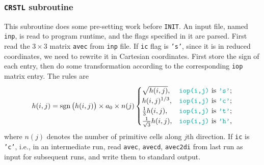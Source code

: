 
\subsubsection{\texttt{CRSTL} subroutine}
\label{sssec:crstl}

This subroutine does some pre-setting work before \texttt{INIT}.
An input file, named \texttt{inp}, is read to program runtime, and the flags
specified in it are parsed.
First read the $3 \times 3$ matrix \texttt{avec} from \texttt{inp} file.
If \texttt{ic} flag is \texttt{'s'},
since it is in reduced coordinates, we need to rewrite it in Cartesian
coordinates. First store the sign of each entry, then do some transformation according to
the corresponding \texttt{iop} matrix entry. The
rules are
\begin{equation}\label{eq:crstltrans}
	h(i, j) = \sign \big( h(i, j) \big) \times a_0 \times n(j)
	\begin{cases}
		\sqrt{h(i, j)},                 & \text{\texttt{iop(i,j)} is \texttt{'s'};} \\
		h(i, j)^{1/3},                  & \text{\texttt{iop(i,j)} is \texttt{'c'};} \\
		\frac{ 1 }{ 3 } h(i, j),        & \text{\texttt{iop(i,j)} is \texttt{'t'};} \\
		\frac{ 1 }{ \sqrt{3} } h(i, j), & \text{\texttt{iop(i,j)} is \texttt{'h'},}
	\end{cases}
\end{equation}
where $n(j)$ denotes the number of primitive cells along $j$th direction.
If \texttt{ic} is \texttt{'c'}, i.e., in an intermediate run, read \texttt{avec}, \texttt{avecd}, \texttt{avec2di} from last run as
input for subsequent runs, and write them to standard output.

